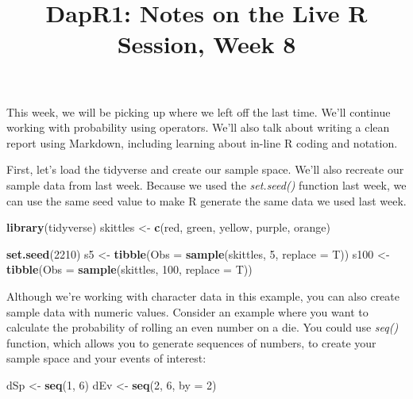 \documentclass[
]{article}
\title{DapR1: Notes on the Live R Session, Week 8}
\author{}
\date{\vspace{-2.5em}}
\newenvironment{Shaded}{\begin{snugshade}}{\end{snugshade}}
\newcommand{\AttributeTok}[1]{\textcolor[rgb]{0.13,0.29,0.53}{#1}}
\newcommand{\DecValTok}[1]{\textcolor[rgb]{0.00,0.00,0.81}{#1}}
\newcommand{\FunctionTok}[1]{\textcolor[rgb]{0.13,0.29,0.53}{\textbf{#1}}}
\newcommand{\NormalTok}[1]{#1}
\newcommand{\OtherTok}[1]{\textcolor[rgb]{0.56,0.35,0.01}{#1}}
\newcommand{\StringTok}[1]{\textcolor[rgb]{0.31,0.60,0.02}{#1}}
\begin{document}
\maketitle

This week, we will be picking up where we left off the last time. We'll
continue working with probability using operators. We'll also talk about
writing a clean report using Markdown, including learning about in-line
R coding and notation.

First, let's load the tidyverse and create our sample space. We'll also
recreate our sample data from last week. Because we used the
\emph{set.seed()} function last week, we can use the same seed value to
make R generate the same data we used last week.

\begin{Shaded}
\begin{Highlighting}[]
\FunctionTok{library}\NormalTok{(tidyverse)}
\NormalTok{skittles }\OtherTok{\textless{}{-}} \FunctionTok{c}\NormalTok{(}\StringTok{\textquotesingle{}red\textquotesingle{}}\NormalTok{, }\StringTok{\textquotesingle{}green\textquotesingle{}}\NormalTok{, }\StringTok{\textquotesingle{}yellow\textquotesingle{}}\NormalTok{, }\StringTok{\textquotesingle{}purple\textquotesingle{}}\NormalTok{, }\StringTok{\textquotesingle{}orange\textquotesingle{}}\NormalTok{)}

\FunctionTok{set.seed}\NormalTok{(}\DecValTok{2210}\NormalTok{)}
\NormalTok{s5 }\OtherTok{\textless{}{-}} \FunctionTok{tibble}\NormalTok{(}\AttributeTok{Obs =} \FunctionTok{sample}\NormalTok{(skittles, }\DecValTok{5}\NormalTok{, }\AttributeTok{replace =}\NormalTok{ T))}
\NormalTok{s100 }\OtherTok{\textless{}{-}} \FunctionTok{tibble}\NormalTok{(}\AttributeTok{Obs =} \FunctionTok{sample}\NormalTok{(skittles, }\DecValTok{100}\NormalTok{, }\AttributeTok{replace =}\NormalTok{ T))}
\end{Highlighting}
\end{Shaded}

Although we're working with character data in this example, you can also
create sample data with numeric values. Consider an example where you
want to calculate the probability of rolling an even number on a die.
You could use \emph{seq()} function, which allows you to generate
sequences of numbers, to create your sample space and your events of
interest:

\begin{Shaded}
\begin{Highlighting}[]
\NormalTok{dSp }\OtherTok{\textless{}{-}} \FunctionTok{seq}\NormalTok{(}\DecValTok{1}\NormalTok{, }\DecValTok{6}\NormalTok{)}
\NormalTok{dEv }\OtherTok{\textless{}{-}} \FunctionTok{seq}\NormalTok{(}\DecValTok{2}\NormalTok{, }\DecValTok{6}\NormalTok{, }\AttributeTok{by =} \DecValTok{2}\NormalTok{)}
\end{Highlighting}
\end{Shaded}
\end{document}
